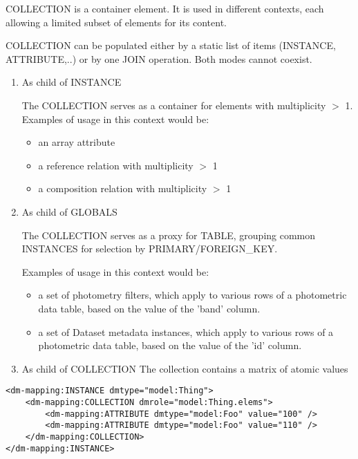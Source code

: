     COLLECTION is a container element.  It is used in different contexts, each allowing a limited subset of elements for its content. 
    
    COLLECTION can be populated either by a static list of items (INSTANCE, ATTRIBUTE,..) or by one JOIN operation. Both  modes cannot coexist.
    
    \begin{enumerate}
    \item{As child of INSTANCE}
      
      The COLLECTION serves as a container for elements with multiplicity $>$ 1.\\
      Examples of usage in this context would be:
      \begin{itemize}
        \item an array attribute
        \item a reference relation with multiplicity $>$ 1
        \item a composition relation with multiplicity $>$ 1
      \end{itemize}
      
    \item{As child of GLOBALS}
          
      The COLLECTION serves as a proxy for TABLE, grouping common INSTANCES for selection by PRIMARY/FOREIGN\_KEY.
     
      Examples of usage in this context would be:
      \begin{itemize}
        \item a set of photometry filters, which apply to various rows of a photometric data table, based on the value of the 'band' column.
        \item a set of Dataset metadata instances, which apply to various rows of a photometric data table, based on the value of the 'id' column.
      \end{itemize}
          
    \item{As child of COLLECTION}
	The collection contains a matrix of  atomic values
        
    \end{enumerate}
   
\begin{lstlisting}[frame=single,caption={Example of COLLECTION child of INSTANCE},style=XML,basicstyle=\tiny]
<dm-mapping:INSTANCE dmtype="model:Thing">
    <dm-mapping:COLLECTION dmrole="model:Thing.elems">
        <dm-mapping:ATTRIBUTE dmtype="model:Foo" value="100" />
        <dm-mapping:ATTRIBUTE dmtype="model:Foo" value="110" />
    </dm-mapping:COLLECTION>
</dm-mapping:INSTANCE>
\end{lstlisting}   

